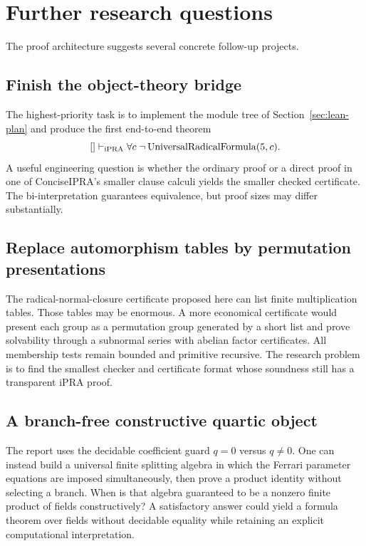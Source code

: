 \section{Further research questions}
\label{sec:further-research}

The proof architecture suggests several concrete follow-up projects.

\subsection{Finish the object-theory bridge}

The highest-priority task is to implement the module tree of
Section~\ref{sec:lean-plan} and produce the first end-to-end theorem
\[
 []\vdash_{\mathrm{iPRA}}
 \forall c\;\neg\operatorname{UniversalRadicalFormula}(5,c).
\]
A useful engineering question is whether the ordinary  proof or a
direct proof in one of ConciseIPRA's smaller clause calculi yields the smaller
checked certificate.  The bi-interpretation guarantees equivalence, but proof
sizes may differ substantially.

\subsection{Replace automorphism tables by permutation presentations}

The radical-normal-closure certificate proposed here can list finite
multiplication tables.  Those tables may be enormous.  A more economical
certificate would present each group as a permutation group generated by a
short list and prove solvability through a subnormal series with abelian factor
certificates.  All membership tests remain bounded and primitive recursive.
The research problem is to find the smallest checker and certificate format
whose soundness still has a transparent iPRA proof.

\subsection{A branch-free constructive quartic object}

The report uses the decidable coefficient guard $q=0$ versus $q\ne0$.
One can instead build a universal finite splitting algebra in which the
Ferrari parameter equations are imposed simultaneously, then prove a product
identity without selecting a branch.  When is that algebra guaranteed to be a
nonzero finite product of fields constructively?  A satisfactory answer could
yield a formula theorem over fields without decidable equality while retaining
an explicit computational interpretation.


